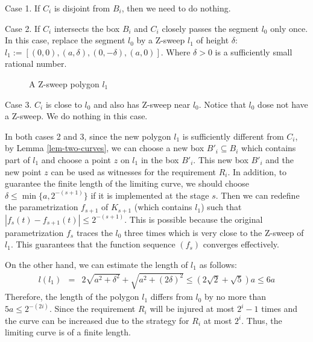 \documentclass{LMCS}
\theoremstyle{plain}
\begin{document}
Case 1. If $C_i$ is disjoint from $B_i$, then we need to do nothing.

Case 2. If $C_i$ intersects the box $B_i$ and $C_i$ closely passes the segment $l_0$ only once. In this case, replace the segment $l_0$ by a Z-sweep $l_1$ of height $\delta$: $l_1 :=[(0,0),(a, \delta),(0, -\delta),(a, 0)]$. Where $\delta>0$ is a sufficiently small rational number.

\begin{figure}[h]
\begin{center}
\end{center}
\caption{A Z-sweep polygon $l_{1}$}\label{fig-R-M}
\end{figure}

Case 3. $C_i$ is close to $l_0$ and also has Z-sweep near $l_0$. Notice that $l_0$ dose not have a Z-sweep. We do nothing in this case.

In both cases 2 and 3, since the new polygon $l_1$ is sufficiently different from $C_i$, by Lemma \ref{lem-two-curves}, we can choose a new box $B'_i \subseteq B_i$ which contains part of $l_1$ and choose a point $z$ on $l_1$ in the box $B'_i$. This new box $B'_i$ and the new point $z$ can be used as witnesses for the requirement $R_i$. In addition, to guarantee the finite length of the limiting curve, we should choose $\delta \le \min\{a, 2^{-(s+1)}\}$ if it is implemented at the stage $s$. Then we can redefine the parametrization $f_{s+1}$ of $K_{s+1}$ (which contains $l_1$) such that  $|f_{s}(t) -f_{s+1}(t)| \le 2^{-{(s+1)}}$. This is possible because the original parametrization $f_s$ traces the $l_0$ three times which is very close to the Z-sweep of $l_1$. This guarantees that the function sequence $(f_s)$ converges effectively.

On the other hand, we can estimate the length of $l_1$ as follows:
\begin{eqnarray*}
l(l_1) &=& 2\sqrt{a^2 + \delta^2} + \sqrt{a^2 + (2\delta)^2} \le (2\sqrt{2} +\sqrt{5})a \le 6a
\end{eqnarray*}
Therefore, the length of the polygon $l_1$ differs from $l_0$ by no more than $5a \le 2^{-(2i)}$. Since the requirement $R_i$ will be injured at most $2^i-1$ times and the curve can be increased due to the strategy for $R_i$ at most $2^i$. Thus, the limiting curve is of a finite length.
\end{document}
